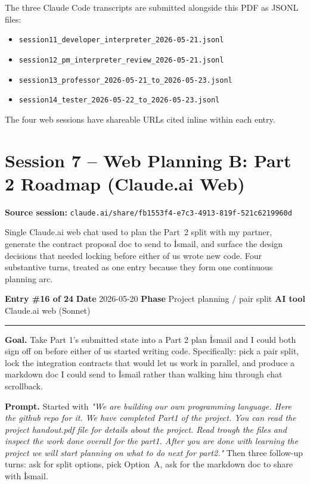 \documentclass[11pt,a4paper]{article}
\newcommand{\entryheader}[4]{%
    \par\vspace{1em}\noindent\textbf{Entry \#{#1}} \textbullet{} \textbf{Date} #2 \textbullet{} \textbf{Phase} #3 \textbullet{} \textbf{AI tool} #4 \par\vspace{0.3em}\noindent\rule{\textwidth}{0.4pt}\par\vspace{0.3em}}
\newcommand{\sessionheader}[1]{%
    \par\vspace{1.5em}\noindent\textbf{Source session: }\texttt{#1}\par\vspace{0.5em}}
\newcommand{\field}[1]{\noindent\textbf{#1}}
\begin{document}
The three Claude Code transcripts are submitted alongside this PDF as
JSONL files:

\begin{itemize}[leftmargin=*,itemsep=0pt]
\item \texttt{session11\_developer\_interpreter\_2026-05-21.jsonl}
\item \texttt{session12\_pm\_interpreter\_review\_2026-05-21.jsonl}
\item \texttt{session13\_professor\_2026-05-21\_to\_2026-05-23.jsonl}
\item \texttt{session14\_tester\_2026-05-22\_to\_2026-05-23.jsonl}
\end{itemize}

The four web sessions have shareable URLs cited inline within each
entry.


\section{Session 7 -- Web Planning B: Part 2 Roadmap (Claude.ai Web)}

\sessionheader{claude.ai/share/fb1553f4-e7c3-4913-819f-521c6219960d}

Single Claude.ai web chat used to plan the Part~2 split with my
partner, generate the contract proposal doc to send to İsmail, and
surface the design decisions that needed locking before either of us
wrote new code. Four substantive turns, treated as one entry because
they form one continuous planning arc.

\entryheader{16 of 24}{2026-05-20}{Project planning / pair split}{Claude.ai web (Sonnet)}

\field{Goal.} Take Part 1's submitted state into a Part 2 plan İsmail
and I could both sign off on before either of us started writing code.
Specifically: pick a pair split, lock the integration contracts that
would let us work in parallel, and produce a markdown doc I could
send to İsmail rather than walking him through chat scrollback.

\field{Prompt.} Started with \emph{"We are building our own programming
language. Here the github repo for it. We have completed Part1 of the
project. You can read the project handout.pdf file for details about
the project. Read trough the files and inspect the work done overall
for the part1. After you are done with learning the project we will
start planning on what to do next for part2."} Then three follow-up
turns: ask for split options, pick Option~A, ask for the markdown doc
to share with İsmail.
\end{document}
